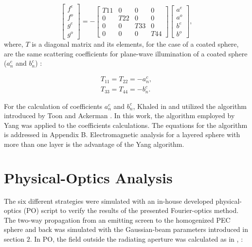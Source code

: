 \documentclass{osa-article}
\begin{document}
\begin{equation}\label{eq5}
\begin{bmatrix} f^e \\ f^o \\ g^e \\ g^o \end{bmatrix}
=-\begin{bmatrix} T11 & 0 & 0 & 0 \\ 0 & T22 & 0 & 0 \\ 0 & 0 & T33 & 0\\ 0 & 0 & 0 & T44 \end{bmatrix}
\begin{bmatrix} a^e \\ a^o \\ b^e \\ b^o \end{bmatrix}, 
\end{equation}
where, $T$ is a diagonal matrix and its elements, for the case of a coated sphere, are the same scattering coefficients for plane-wave illumination of a coated sphere ($a^c_n$ and $b^c_n$) \cite{esam94}:

\begin{equation}\label{eq6}
\begin{aligned}
T_{11}=T_{22}=-a^c_n,\\
T_{33}=T_{44}=-b^c_n.
\end{aligned}
\end{equation}

For the calculation of coefficients $a^c_n$ and $b^c_n$, Khaled in \cite{esam93} and \cite{esam94} utilized the algorithm introduced by Toon and Ackerman \cite{Toon}. In this work, the algorithm employed by Yang \cite{Yang, pena} was applied to the coefficients calculations. The equations for the algorithm is addressed in Appendix B. Electromagnetic analysis for a layered sphere with more than one layer is the advantage of the Yang algorithm.





\section{Physical-Optics Analysis}

The six different strategies were simulated with an in-house developed physical-optics (PO) script to verify the results of the presented Fourier-optics method. The two-way propagation from an emitting screen to the homogenized PEC sphere and back was simulated with the Gaussian-beam parameters introduced in section $2$. In PO, the field outside the radiating aperture was calculated as in \cite{kong1986electromagnetic}, \cite{orfanidis2002electromagnetic}:
\end{document}
